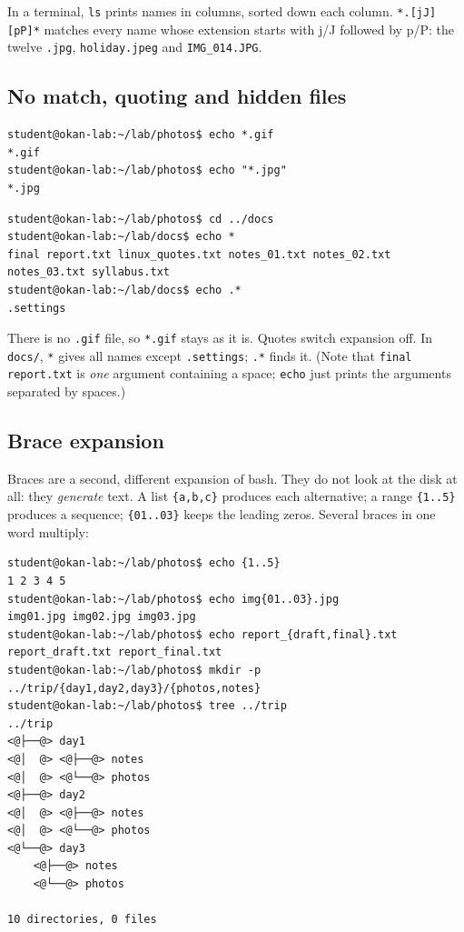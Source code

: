 \documentclass[11pt,a4paper]{article}
\newcommand{\cmd}[1]{\texttt{#1}}
\begin{document}
In a terminal, \cmd{ls} prints names in columns, sorted down each column. \texttt{*.[jJ][pP]*} matches every name whose extension starts with j/J followed by p/P: the twelve \texttt{.jpg}, \texttt{holiday.jpeg} and \texttt{IMG\_014.JPG}.

\subsection{No match, quoting and hidden files}

\begin{lstlisting}[style=term]
student@okan-lab:~/lab/photos$ echo *.gif
*.gif
student@okan-lab:~/lab/photos$ echo "*.jpg"
*.jpg
\end{lstlisting}
\begin{lstlisting}[style=term]
student@okan-lab:~/lab/photos$ cd ../docs
student@okan-lab:~/lab/docs$ echo *
final report.txt linux_quotes.txt notes_01.txt notes_02.txt notes_03.txt syllabus.txt
student@okan-lab:~/lab/docs$ echo .*
.settings
\end{lstlisting}

There is no \texttt{.gif} file, so \texttt{*.gif} stays as it is. Quotes switch expansion off. In \texttt{docs/}, \texttt{*} gives all names except \texttt{.settings}; \texttt{.*} finds it. (Note that \texttt{final report.txt} is \emph{one} argument containing a space; \cmd{echo} just prints the arguments separated by spaces.)

\subsection{Brace expansion}

Braces are a second, different expansion of bash. They do not look at the disk at all: they \emph{generate} text. A list \texttt{\{a,b,c\}} produces each alternative; a range \texttt{\{1..5\}} produces a sequence; \texttt{\{01..03\}} keeps the leading zeros. Several braces in one word multiply:

\begin{lstlisting}[style=term]
student@okan-lab:~/lab/photos$ echo {1..5}
1 2 3 4 5
student@okan-lab:~/lab/photos$ echo img{01..03}.jpg
img01.jpg img02.jpg img03.jpg
student@okan-lab:~/lab/photos$ echo report_{draft,final}.txt
report_draft.txt report_final.txt
student@okan-lab:~/lab/photos$ mkdir -p ../trip/{day1,day2,day3}/{photos,notes}
student@okan-lab:~/lab/photos$ tree ../trip
../trip
<@├──@> day1
<@│  @> <@├──@> notes
<@│  @> <@└──@> photos
<@├──@> day2
<@│  @> <@├──@> notes
<@│  @> <@└──@> photos
<@└──@> day3
    <@├──@> notes
    <@└──@> photos

10 directories, 0 files
\end{lstlisting}
\end{document}
